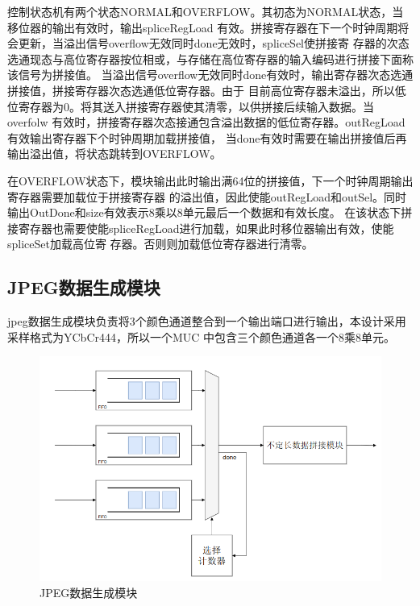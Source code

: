 \documentclass{article}
\numberwithin {equation}{section}
\begin{document}
\begin{spacing}{1.25}
      控制状态机有两个状态NORMAL和OVERFLOW。其初态为NORMAL状态，当移位器的输出有效时，输出spliceRegLoad
      有效。拼接寄存器在下一个时钟周期将会更新，当溢出信号overflow无效同时done无效时，spliceSel使拼接寄
      存器的次态选通现态与高位寄存器按位相或，与存储在高位寄存器的输入编码进行拼接下面称该信号为拼接值。
      当溢出信号overflow无效同时done有效时，输出寄存器次态选通拼接值，拼接寄存器次态选通低位寄存器。由于
      目前高位寄存器未溢出，所以低位寄存器为0。将其送入拼接寄存器使其清零，以供拼接后续输入数据。当overfolw
      有效时，拼接寄存器次态接通包含溢出数据的低位寄存器。outRegLoad有效输出寄存器下个时钟周期加载拼接值，
      当done有效时需要在输出拼接值后再输出溢出值，将状态跳转到OVERFLOW。

      在OVERFLOW状态下，模块输出此时输出满64位的拼接值，下一个时钟周期输出寄存器需要加载位于拼接寄存器
      的溢出值，因此使能outRegLoad和outSel。同时输出OutDone和size有效表示8乘以8单元最后一个数据和有效长度。
      在该状态下拼接寄存器也需要使能spliceRegLoad进行加载，如果此时移位器输出有效，使能spliceSet加载高位寄
      存器。否则则加载低位寄存器进行清零。

  \subsection{JPEG数据生成模块}
    \vspace{1em}
    jpeg数据生成模块负责将3个颜色通道整合到一个输出端口进行输出，本设计采用采样格式为YCbCr444，所以一个MUC
    中包含三个颜色通道各一个8乘8单元。

    \begin{figure}[H]
      \centering
      \includegraphics[scale=0.4]{./pictures/数据生成模块.png}
      \caption{JPEG数据生成模块}
      \label{数据生成模块}
    \end{figure}


\end{spacing}
\end{document}
